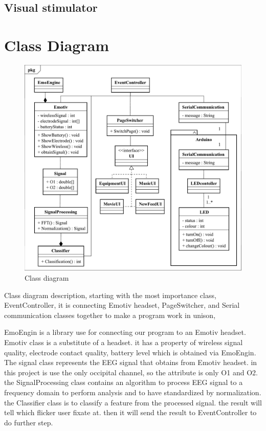 \subsection{Visual stimulator}
\newpage
\section{Class Diagram}

\begin{figure}[ht]
	\centering
	\includegraphics[width=\textwidth]{chapter5/Class.pdf}
	\caption{Class diagram}
\end{figure}

Class diagram description, starting with the most importance class,   EventController, it is connecting Emotiv headset, PageSwitcher, and Serial communication classes together to make a program work in unison,

EmoEngin is a library use for connecting our program to an Emotiv headset.  Emotiv class is a substitute of a headset. it has a property of wireless signal quality, electrode contact quality, battery level which is obtained via EmoEngin. The signal class represents the EEG signal that obtains from Emotiv headset. in this project is use the only occipital channel, so the attribute is only O1 and O2. the SignalProcessing class contains an algorithm to process EEG signal to a frequency domain to perform analysis and to have standardized by normalization. the Classifier class is to classify a feature from the processed signal. the result will tell which flicker user fixate at. then it will send the result to EventController to do further step.

